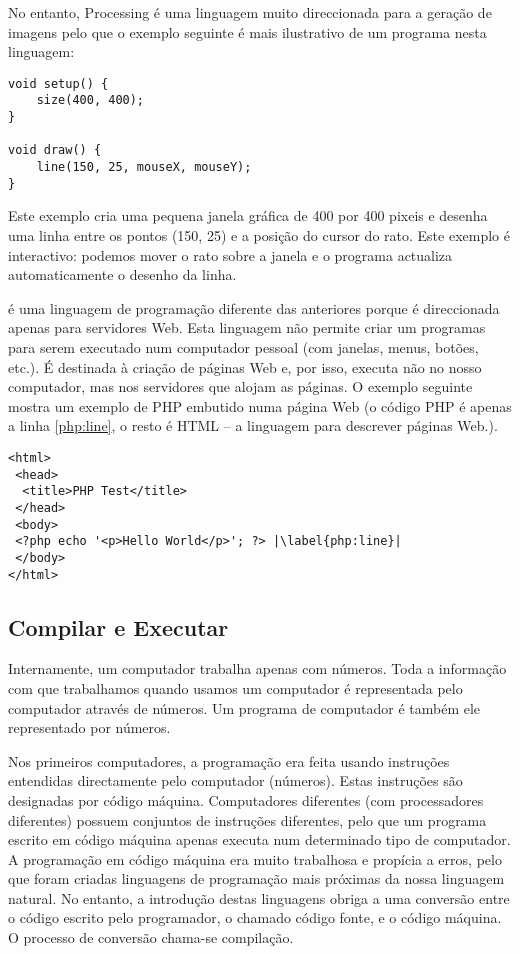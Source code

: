 \begin{description}
No entanto, Processing é uma linguagem muito direccionada para a geração de imagens pelo que o exemplo seguinte é mais ilustrativo de um programa nesta linguagem:
\begin{lstlisting}
void setup() {
	size(400, 400);
}
 
void draw() {
	line(150, 25, mouseX, mouseY);
}
\end{lstlisting}
Este exemplo cria uma pequena janela gráfica de 400 por 400 pixeis e desenha uma linha entre os pontos (150, 25) e a posição do cursor do rato. Este exemplo é interactivo: podemos mover o rato sobre a janela e o programa actualiza automaticamente o desenho da linha. 

\item[PHP] é uma linguagem de programação diferente das anteriores porque é direccionada apenas para servidores Web. Esta linguagem não permite criar um programas para serem executado num computador pessoal (com janelas, menus, botões, etc.). É destinada à criação de páginas Web e, por isso, executa não no nosso computador, mas nos servidores que alojam as páginas. O exemplo seguinte mostra um exemplo de PHP embutido numa página Web (o código PHP é apenas a linha \ref{php:line}, o resto é HTML -- a linguagem para descrever páginas Web.).
\begin{lstlisting}[escapechar=|]
<html>
 <head>
  <title>PHP Test</title>
 </head>
 <body>
 <?php echo '<p>Hello World</p>'; ?> |\label{php:line}|
 </body>
</html>
\end{lstlisting}

\end{description}

\subsection{Compilar e Executar}
Internamente, um computador trabalha apenas com números. Toda a informação com que trabalhamos quando usamos um computador é representada pelo computador através de números. Um programa de computador é também ele representado por números. 

Nos primeiros computadores, a programação era feita usando instruções entendidas directamente pelo computador (números). Estas instruções são designadas por código máquina. Computadores diferentes (com processadores diferentes) possuem conjuntos de instruções diferentes, pelo que um programa escrito em código máquina apenas executa num determinado tipo de computador. 
A programação em código máquina era muito trabalhosa e propícia a erros, pelo que foram criadas linguagens de programação  mais próximas da nossa linguagem natural. No entanto, a introdução destas linguagens obriga a uma conversão entre o código escrito pelo programador, o chamado código fonte, e o código máquina. O processo de conversão chama-se compilação.


